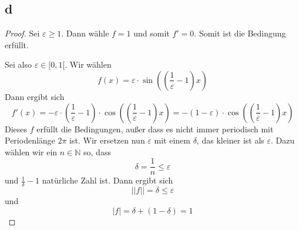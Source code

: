 \documentclass[10pt,a4paper]{article}
\begin{document}
\subsection*{d}

\begin{proof}
Sei $\varepsilon \ge 1$.
Dann wähle $f = 1$ und somit $f' = 0$.
Somit ist die Bedingung erfüllt.

Sei also $\varepsilon \in [0, 1[$.
Wir wählen
\begin{equation}
f(x) = \varepsilon \cdot \sin \left( (\frac{1}{\varepsilon} - 1) x \right)
\end{equation}
Dann ergibt sich
\begin{equation}
f'(x) = -\varepsilon \cdot (\frac{1}{\varepsilon} - 1) \cdot \cos \left( (\frac{1}{\varepsilon} - 1) x \right) = -(1 - \varepsilon) \cdot \cos \left( (\frac{1}{\varepsilon} - 1) x \right)
\end{equation}
Dieses $f$ erfüllt die Bedingungen, außer dass es nicht immer periodisch mit Periodenlänge $2\pi$ ist.
Wir ersetzen nun $\varepsilon$ mit einem $\delta$, das kleiner ist als $\varepsilon$.
Dazu wählen wir ein $n \in \mathbb{N}$ so, dass
\begin{equation}
\delta = \frac{1}{n} \le \varepsilon
\end{equation}
und $\frac{1}{\delta} - 1$ natürliche Zahl ist.
Dann ergibt sich
\begin{equation}
||f|| = \delta \le \varepsilon
\end{equation}
und
\begin{equation}
|f| = \delta + (1 - \delta) = 1
\end{equation}
\end{proof}
\end{document}
